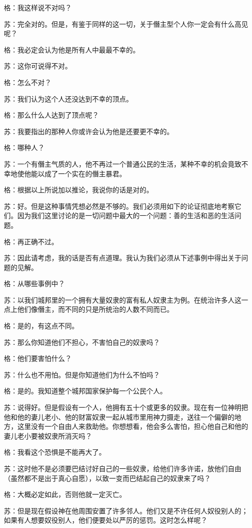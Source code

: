 \documentclass[12pt,oneside]{book}
\begin{document}
格：我这样说不对吗？

苏：完全对的。但是，有鉴于同样的这一切，关于僭主型个人你一定会有什么高见呢？

格：我必定会认为他是所有人中最最不幸的。

苏：这你可说得不对。

格：怎么不对？

苏：我们认为这个人还没达到不幸的顶点。

格：那么什么人达到了顶点呢？

苏：我要指出的那种人你或许会认为他是还要更不幸的。

格：哪种人？

苏：一个有僭主气质的人，他不再过一个普通公民的生活，某种不幸的机会竟致不幸地使他能以成了一个实在的僭主暴君。

格：根据以上所说加以推论，我说你的话是对的。

苏：好。但是这种事情凭想必然是不够的。我们必须用如下的论证彻底地考察它们。因为我们这里讨论的是一切问题中最大的一个问题：善的生活和恶的生活问题。

格：再正确不过。

苏：因此请考虑，我的话是否有点道理。我认为我们必须从下述事例中得出关于问题的见解。

格：从哪些事例中？

苏：以我们城邦里的一个拥有大量奴隶的富有私人奴隶主为例。在统治许多人这一点上他们像僭主，而不同的只是所统治的人数不同而已。

格：是的，有这点不同。

苏：那么你知道他们不担心，不害怕自己的奴隶吗？

格：他们要害怕什么？

苏：什么也不用怕。但是你知道他们为什么不怕吗？

格：是的。我知道整个城邦国家保护每一个公民个人。

苏：说得好。但是假设有一个人，他拥有五十个或更多的奴隶。现在有一位神明把他和他的妻儿老小、他的财富奴隶一起从城市里用神力摄走，送往一个偏僻的地方，这里没有一个自由人来救助他。你想想看，他会多么害怕，担心他自己和他的妻儿老小要被奴隶所消灭吗？

格：我看这个恐惧是不能再大了。

苏：这时他不是必须要巴结讨好自己的一些奴隶，给他们许多许诺，放他们自由（虽然都不是出于真心自愿），以致一变而巴结起自己的奴隶来了吗？

格：大概必定如此，否则他就一定灭亡。

苏：但是现在假设神在他周围安置了许多邻人。他们又是不许任何人奴役别人的；如果有人想要奴役别人，他们便要处以严厉的惩罚。这时怎么样呢？
\end{document}
